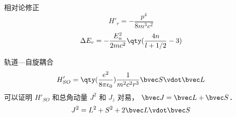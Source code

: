 \begin{issues}
\issueTODO
\end{issues}

相对论修正
\begin{equation}
H'_r = -\frac{p^4}{8m^3 c^2}
\end{equation}
\begin{equation}
\Delta E_r = -\frac{E_n^2}{2mc^2} \qty(\frac{4n}{l+1/2}-3)
\end{equation}

轨道—自旋耦合
\begin{equation}
H'_{SO} = \qty(\frac{e^2}{8\pi\epsilon_0}) \frac{1}{m^2c^2 r^3} \bvec S \vdot \bvec L
\end{equation}
可以证明 $H'_{SO}$ 和总角动量 $J^2$ 和 $J_z$ 对易， $\bvec J = \bvec L + \bvec S$．
\begin{equation}
J^2 = L^2 + S^2 + 2\bvec L \vdot \bvec S
\end{equation}


